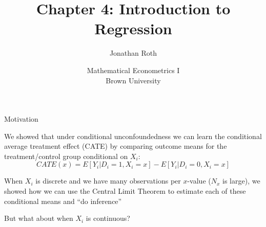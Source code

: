 \documentclass[11pt,english,handout]{beamer}
\newenvironment{wideitemize}{\itemize\addtolength{\itemsep}{10pt}}{\enditemize}
\begin{document}
	
	\begin{frame}[noframenumbering]{}
		\vspace{0.5cm}
		\title[]{Chapter 4: Introduction to Regression}
		\author{Jonathan Roth}
		\date{Mathematical Econometrics I \\ Brown University\\} 
		\titlepage {\small{}\ }\thispagestyle{empty} \vspace{-30pt}
		
	\end{frame}

	
\begin{frame} {Motivation}

\begin{wideitemize}

\item
We showed that under conditional unconfoundedness we can learn the conditional average treatment effect (CATE) by comparing outcome means for the treatment/control group conditional on $X_i$:
$$ CATE(x) = E[ Y_i | D_i = 1 , X_i = x ] - E[Y_i | D_i = 0 ,X_i =x ]$$ 

\item
When $X_i$ is discrete and we have many observations per $x$-value ($N_x$ is large), we showed how we can use the Central Limit Theorem to estimate each of these conditional means and ``do inference'' 

\pause
\item
But what about when $X_i$ is continuous?

\end{wideitemize}
	
\end{frame}	
\end{document}
